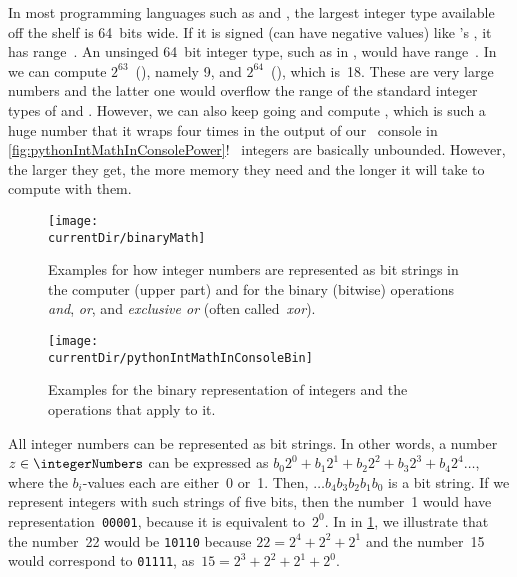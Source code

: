 In most programming languages such as  and , the largest integer type available off the shelf is 64~bits wide.
If it is signed (can have negative values) like 's , it has range~.
An unsinged 64~bit integer type, such as  in , would have range~.
In \python\, we can compute $2^{63}$~(), namely 9, and
$2^{64}$~(), which is~18.
These are very large numbers and the latter one would overflow the range of the standard integer types of  and .
However, we can also keep going and compute , which is such a huge number that it wraps four times in the output of our \python\ console in \cref{fig:pythonIntMathInConsolePower}!
\python\ integers are basically unbounded.
However, the larger they get, the more memory they need and the longer it will take to compute with them.
\endhsection%
%
%
%
%
%
\begin{figure}%
\centering%
\texttt{[image: \\currentDir/binaryMath]}%
\caption{Examples for how integer numbers are represented as bit strings in the computer (upper part) and for the binary (bitwise) operations \emph{and}, \emph{or}, and \emph{exclusive or} (often called~\emph{xor}).}%
\label{fig:binaryMath}%
\end{figure}
\begin{figure}%
\centering%
\texttt{[image: \\currentDir/pythonIntMathInConsoleBin]}%
\caption{Examples for the binary representation of integers and the operations that apply to it.}%
\label{fig:pythonIntMathInConsoleBin}%
\end{figure}

All integer numbers can be represented as bit strings.
In other words, a number $z\in\integerNumbers$ can be expressed as $b_0 2^0 + b_1 2^1 + b_2 2^2 + b_3 2^3 + b_4 2^4\dots$, where the $b_i$-values each are either~0 or~1.
Then, $\dots b_4 b_3 b_2 b_1 b_0$ is a bit string.
If we represent integers with such strings of five bits, then the number~1 would have representation~\texttt{00001}, because it is equivalent to~$2^0$.
In in \cref{fig:binaryMath}, we illustrate that the number~22 would be \texttt{10110} because $22=2^4+2^2+2^1$ and the number~15 would correspond to \texttt{01111}, as~$15=2^3+2^2+2^1+2^0$.

